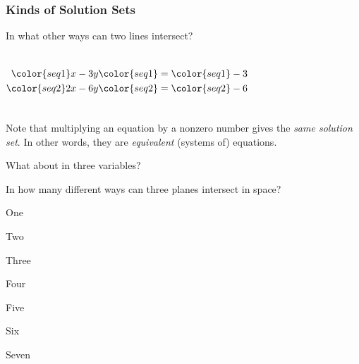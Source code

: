 \begin{frame}
\frametitle{Kinds of Solution Sets}
  
In what other ways can two lines intersect?

\pause\vfill

\begin{columns}[onlytextwidth]
  \[\begin{split}
    \color{seq1}x - 3y &\color{seq1}= \color{seq1}-3 \\
    \color{seq2}2x - 6y &\color{seq2}= \color{seq2}-6
  \end{split}\]
  \pause
  \centering
\end{columns}

\pause
\bigskip
Note that multiplying an equation by a nonzero number gives the
\emph{same solution set}.
\pause In other words, they are \emph{equivalent} (systems
of) equations.

\vfill

\end{frame}



\begin{pollframe}

What about in three variables?
\pause
\bigskip

\begin{poll}
\begin{bluebox}[Poll]{.65\textwidth}
  In how many different ways can three planes intersect in space?

  \smallskip
  \begin{eAlpherate}
  \item One
  \item Two
  \item Three
  \item Four
  \item Five
  \item Six
  \item Seven
  \end{eAlpherate}
\end{bluebox}
\end{poll}


\end{pollframe}


